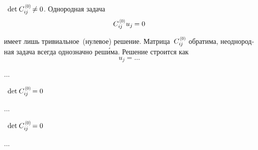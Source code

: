 \begin{otherlanguage}{russian}

\indent
{}\, ${\determinant \hspace{.16ex} C_{i\hspace{-0.1ex}j}^{\hspace{0.2ex}\scalebox{.66}{(0)}} \hspace{-0.25ex} \neq 0}$.
Однородная задача
\vspace{-0.2em}\begin{equation}
C_{i\hspace{-0.1ex}j}^{\hspace{.2ex}\scalebox{.66}{(0)}} \hspace{.1ex} u_{j} \hspace{-0.16ex} = 0
\end{equation}

\nopagebreak\vspace{-0.5em}\noindent
имеет лишь тривиальное~(нулевое) решение.
Матрица~${C_{i\hspace{-0.1ex}j}^{\hspace{0.2ex}\scalebox{.66}{(0)}}}$ обратима, неоднородная задача всегда однозначно реш\'{и}ма.
Решение строится как
\begin{equation}
u_{j} = \ldots
\end{equation}

...


\indent {}\, ${\determinant \hspace{.16ex} C_{i\hspace{-0.1ex}j}^{\hspace{0.2ex}\scalebox{.66}{(0)}} \hspace{-0.25ex} = 0}$

...


\indent {}\, ${\determinant \hspace{.16ex} C_{i\hspace{-0.1ex}j}^{\hspace{0.2ex}\scalebox{.66}{(0)}} \hspace{-0.25ex} = 0}$

...



\end{otherlanguage}

